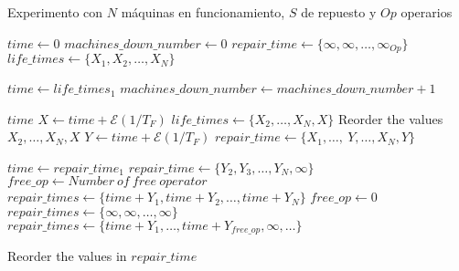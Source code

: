   \begin{algorithm} [H]
    \caption{Experimento con $N$ máquinas en funcionamiento, $S$ de repuesto y $Op$ operarios}
    \label{alg1}
    \begin{algorithmic} [1]
    \STATE $ time \leftarrow  0 $ \label{line:1}\hfill{}
    \STATE $ machines\_down\_number \leftarrow  0 $ \label{line:2}
    \STATE $ repair\_time \leftarrow  \{\infty, \infty, \dots, \infty_{Op}\} $ \label{line:3}
    \STATE $ life\_times \leftarrow \{ X_1, X_2, \dots , X_N \} $ \label{line:4}
    \hfill{}

       \label{line:6}
        \RESET $ time \leftarrow  life\_times_{1}$ \label{line:7}
        \STATE $ machines\_down\_number \leftarrow  machines\_down\_number + 1 $ \label{line:8}

          \RETURN $ time $ \label{line:10}
        \ENDIF
          \STATE $ X \leftarrow time + \mathcal{E}(1/T_F) $
          \STATE $ life\_times \leftarrow \{X_2, \dots, X_N, X\} $
          \STATE Reorder the values ${ X_2, \dots, X_N, X} $
        \ENDIF
          \STATE $ Y \leftarrow time + \mathcal{E}(1/T_F) $
          \STATE $ repair\_time \leftarrow \{X_1, \dots,\ Y, \dots, X_N, Y\} $
        \ENDIF

      \ELSE
        \RESET $ time \leftarrow repair\_time_1 $
        \STATE $ repair\_time \leftarrow \{ Y_2, Y_3, \dots, Y_N, \infty \} $
        \STATE $ free\_op \leftarrow Number\ of\ free\ operator\ $
            \STATE $ repair\_times \leftarrow \{ time + Y_1, time + Y_2, \dots, time + Y_N \} $
                \hfill{}
            \STATE $ free\_op \leftarrow 0 $
        \ENDIF
          \STATE $ repair\_times \leftarrow \{ \infty, \infty, \dots, \infty \} $
        \ENDIF
          \STATE $ repair\_times \leftarrow \{ time + Y_1,\dots, time + Y_{free\_op}, \infty,\dots\} $
          \hfill{}

        \ENDIF
        \STATE Reorder the values in $ repair\_time $
      \ENDIF
    \ENDWHILE
    \end{algorithmic}
  \end{algorithm}

